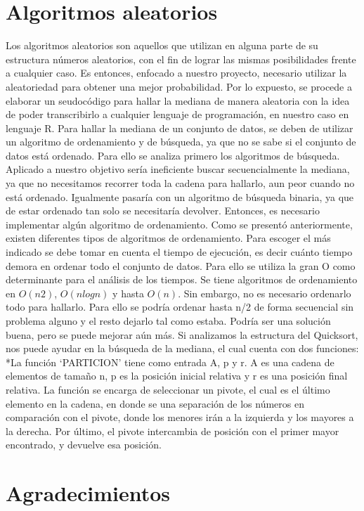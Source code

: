 \documentclass[9pt,draft,a4paper,twoside,onecolumn,romanappendices]{IEEEtran}\usepackage[]{graphicx}\usepackage[]{color}
\theoremstyle{definition}
\begin{document}
\section{Algoritmos aleatorios}
Los algoritmos aleatorios son aquellos que utilizan en alguna parte de su estructura números aleatorios, con el fin de lograr las mismas posibilidades frente a cualquier caso. Es entonces, enfocado a nuestro proyecto, necesario utilizar la aleatoriedad para obtener una mejor probabilidad. Por lo expuesto, se procede a elaborar un seudocódigo para hallar la mediana de manera aleatoria con la idea de poder transcribirlo a cualquier lenguaje de programación, en nuestro caso en lenguaje R. Para hallar la mediana de un conjunto de datos, se deben de utilizar un algoritmo de ordenamiento y de búsqueda, ya que no se sabe si el conjunto de datos está ordenado. Para ello se analiza primero los algoritmos de búsqueda. Aplicado a nuestro objetivo sería ineficiente buscar secuencialmente la mediana, ya que no necesitamos recorrer toda la cadena para hallarlo, aun peor cuando no está ordenado. Igualmente pasaría con un algoritmo de búsqueda binaria, ya que de estar ordenado tan solo se necesitaría devolver. Entonces, es necesario implementar algún algoritmo de ordenamiento.
Como se presentó anteriormente, existen diferentes tipos de algoritmos de ordenamiento. Para escoger el más indicado se debe tomar en cuenta el tiempo de ejecución, es decir cuánto tiempo demora en ordenar todo el conjunto de datos. Para ello se utiliza la gran O como determinante para el análisis de los tiempos. Se tiene algoritmos de ordenamiento en $O(n2)$, $O(nlogn)$ y hasta $O(n)$. 
Sin embargo, no es necesario ordenarlo todo para hallarlo. Para ello se podría ordenar hasta n/2 de forma secuencial sin problema alguno y el resto dejarlo tal como estaba. Podría ser una solución buena, pero se puede mejorar aún más. Si analizamos la estructura del Quicksort, nos puede ayudar en la búsqueda de la mediana, el cual cuenta con dos funciones:
*La función ‘PARTICION’ tiene como entrada A, p y r. A es una cadena de elementos de tamaño n, p es la posición inicial relativa y r es una posición final relativa. La función se encarga de seleccionar un pivote, el cual es el último elemento en la cadena, en donde se una separación de los números en comparación con el pivote, donde los menores irán a la izquierda y los mayores a la derecha. Por último, el pivote intercambia de posición con el primer mayor encontrado, y devuelve esa posición.
\section{Agradecimientos}
\end{document}
